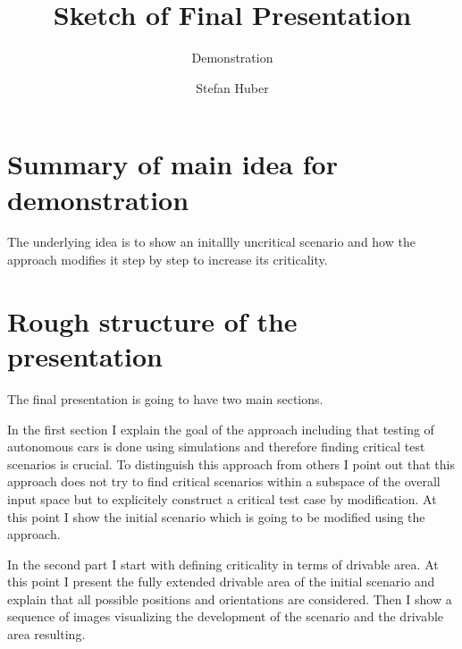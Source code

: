 \documentclass{scrartcl}
\title{Sketch of Final Presentation}
\subtitle{Demonstration}
\author{Stefan Huber}
\begin{document}
\maketitle%

\section{Summary of main idea for demonstration}
The underlying idea is to show an initallly uncritical scenario and how the approach modifies it step by step to increase its criticality.

\section{Rough structure of the presentation}
The final presentation is going to have two main sections.\par
In the first section I explain the goal of the approach including that testing of autonomous cars is done using simulations and therefore finding critical test scenarios is crucial.
To distinguish this approach from others I point out that this approach does not try to find critical scenarios within a subspace of the overall input space but to explicitely construct a critical test case by modification.
At this point I show the initial scenario which is going to be modified using the approach.\par
In the second part I start with defining criticality in terms of drivable area.
At this point I present the fully extended drivable area of the initial scenario and explain that all possible positions and orientations are considered.
Then I show a sequence of images visualizing the development of the scenario and the drivable area resulting.
\end{document}
